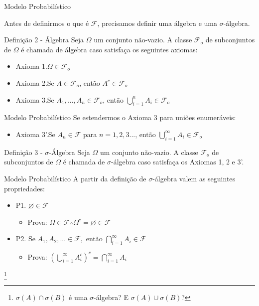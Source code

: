 \documentclass[10pt]{beamer}
\begin{document}
\begin{frame}[fragile]{Modelo Probabilístico}

  Antes de definirmos o que é $\mathcal{F}$, precisamos definir uma álgebra e uma $\sigma$-álgebra.
\begin{block}{Definição 2 - Álgebra}
Seja $\Omega$ um conjunto não-vazio. A classe $\mathcal{F}_o$ de subconjuntos de $\Omega$ é chamada de álgebra caso satisfaça os seguintes axiomas:
\begin{itemize}
    \item Axioma 1.\quad $\Omega \in \mathcal{F}_o$ 
    \item Axioma 2.\quad Se $A \in \mathcal{F}_o$, então $A^c \in \mathcal{F}_o$ 
    \item Axioma 3.\quad Se $A_1,...,A_n \in \mathcal{F}_o$, então $\bigcup\limits_{i=1}^{n} A_{i} \in \mathcal{F}_o$ 
\end{itemize}
\end{block}
\end{frame}

\begin{frame}[fragile]{Modelo Probabilístico}
Se estendermos o Axioma 3 para uniões enumeráveis:
\begin{itemize}
    \item Axioma 3'.\quad Se $A_n \in \mathcal{F}$ para $\textit{n}=1,2,3...$, então $\bigcup\limits_{i=1}^{\infty} A_{i} \in \mathcal{F}_o$ 
\end{itemize}
\begin{block}{Definição 3 - $\sigma$-Álgebra}
Seja $\Omega$ um conjunto não-vazio. A classe $\mathcal{F}_o$ de subconjuntos de $\Omega$ é chamada de $\sigma$-álgebra caso satisfaça os Axiomas 1, 2 e 3'.
\end{block}
\end{frame}

\begin{frame}[fragile]{Modelo Probabilístico}
A partir da definição de $\sigma$-álgebra valem as seguintes propriedades:
\begin{itemize}
    \item P1. \quad $\varnothing \in \mathcal{F}$
    \begin{itemize}
        \item[] Prova: $\Omega \in \mathcal{F} \therefore \Omega^c=\varnothing \in \mathcal{F}$
    \end{itemize}
    \item P2. \quad Se $A_1,A_2,... \in \mathcal{F},$ então $\bigcap\limits_{i=1}^{\infty} A_{i} \in \mathcal{F}$
    \begin{itemize}
        \item[] Prova: $(\bigcup\limits_{i=1}^{\infty} A^c_{i})^c=
        \bigcap\limits_{i=1}^{\infty} A_{i}$
    \end{itemize}
\end{itemize}
\let\thefootnote\relax\footnote{$\sigma(A) \cap \sigma(B)$ é uma $\sigma$-álgebra?
E $\sigma(A) \cup \sigma(B)$?}
\end{frame}
\end{document}
